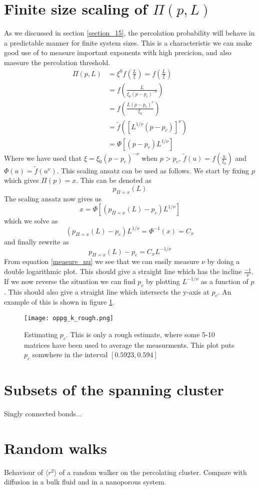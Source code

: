 \documentclass[a4paper,english, 10pt, twoside]{article}
\begin{document}
\section{Finite size scaling of $\Pi(p,L)$}
As we discussed in section \ref{section_15}, the percolation probability will behave in a predictable manner for finite 
system sizes. This is a characteristic we can make good use of to measure important exponents with high precicion, and also 
maesure the percolation threshold.
\begin{align*}
 \Pi(p,L) &= \xi^0f\left(\frac{L}{\xi}\right) = f\left(\frac{L}{\xi}\right)\\
 &= f\left(\frac{L}{\xi_0(p-p_c)^{-\nu}}\right)\\
 &= f\left(\frac{L(p-p_c)^\nu}{\xi_0}\right)\\
  &= \tilde{f}\left(\left[L^{1/\nu}(p-p_c)\right]^\nu\right)\\
  &= \Phi\left[\left(p-p_c\right)L^{1/\nu}\right]
\end{align*}
Where we have used that $\xi = \xi_0(p-p_c)^{-\nu}$ when $p>p_c$, $\tilde{f}(u) = f\left(\frac{u}{\xi_0}\right)$ and $\Phi(u)
= \tilde{f}(u^\nu)$. This scaling ansatz can be used as follows. We start by fixing $p$ which gives $\Pi(p) = x$. This can be 
denoted as 
\begin{equation}
 p_{\Pi=x}\left(L\right)
\end{equation}
The scaling ansatz now gives us
\begin{equation}
 x = \Phi\left[\left( p_{\Pi=x}\left(L\right)-p_c\right)L^{1/\nu}\right]
\end{equation}
which we solve as 
$$
\left(p_{\Pi=x}\left(L\right)-p_c\right)L^{1/\nu} = \Phi^{-1}(x) = C_x
$$
and finally rewrite as
\begin{equation}\label{measure_nu}
 p_{\Pi=x}\left(L\right)-p_c = C_xL^{-1/\nu}
\end{equation}
From equation \ref{measure_nu} we see that we can easily measure $\nu$ by doing a double logarithmic plot. This should give a 
straight line which has the incline $\frac{-1}{\nu}$. \\
If we now reverse the situation we can find $p_c$ by plotting $L^{-1/\nu}$ as a function of $p$. This should also give a straight 
line which intersects the y-axis at $p_c$. An example of this is shown in figure \ref{measure_pc}.
\begin{figure}[H]
\centering
\texttt{[image: oppg\_k\_rough.png]}
\caption{Estimating $p_c$. This is only a rough estimate, where some 5-10 matrices have been used to average the measurments. 
This plot puts $p_c$ somwhere in the interval $[0.5923, 0.594]$}
\label{measure_pc}
\end{figure}

\section{Subsets of the spanning cluster}
Singly connected bonds...

\section{Random walks}
Behaviour of $\langle r^2\rangle$ of a random walker on the percolating cluster. Compare with diffusion in a bulk fluid and in 
a nanoporous system.
\end{document}

